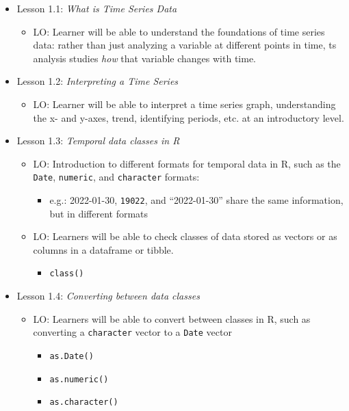 \documentclass[
]{book}
\providecommand{\tightlist}{%
  \setlength{\itemsep}{0pt}\setlength{\parskip}{0pt}}
\begin{document}
\begin{itemize}
\tightlist
\item
  Lesson 1.1: \emph{What is Time Series Data}

  \begin{itemize}
  \tightlist
  \item
    LO: Learner will be able to understand the foundations of time series data: rather than just analyzing a variable at different points in time, ts analysis studies \emph{how} that variable changes with time.
  \end{itemize}
\item
  Lesson 1.2: \emph{Interpreting a Time Series}

  \begin{itemize}
  \tightlist
  \item
    LO: Learner will be able to interpret a time series graph, understanding the x- and y-axes, trend, identifying periods, etc. at an introductory level.
  \end{itemize}
\item
  Lesson 1.3: \emph{Temporal data classes in R}

  \begin{itemize}
  \tightlist
  \item
    LO: Introduction to different formats for temporal data in R, such as the \texttt{Date}, \texttt{numeric}, and \texttt{character} formats:

    \begin{itemize}
    \tightlist
    \item
      e.g.: 2022-01-30, \texttt{19022}, and ``2022-01-30'' share the same information, but in different formats
    \end{itemize}
  \item
    LO: Learners will be able to check classes of data stored as vectors or as columns in a dataframe or tibble.

    \begin{itemize}
    \tightlist
    \item
      \texttt{class()}
    \end{itemize}
  \end{itemize}
\item
  Lesson 1.4: \emph{Converting between data classes}

  \begin{itemize}
  \tightlist
  \item
    LO: Learners will be able to convert between classes in R, such as converting a \texttt{character} vector to a \texttt{Date} vector

    \begin{itemize}
    \tightlist
    \item
      \texttt{as.Date()}
    \item
      \texttt{as.numeric()}
    \item
      \texttt{as.character()}
    \end{itemize}
  \end{itemize}
\end{itemize}
\end{document}
